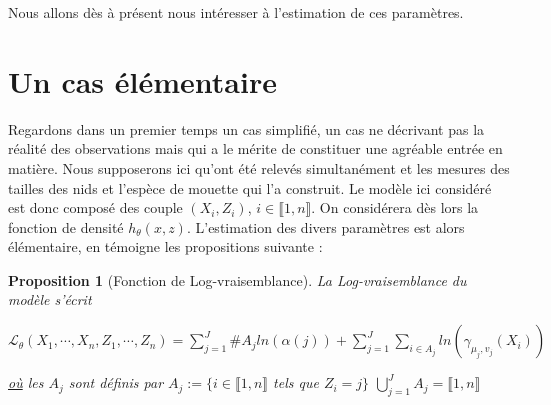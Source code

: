 \documentclass[frenchb]{report}
\newcommand{\1}{\mathbbm{1}}
\newtheorem{prop}{Proposition}
\theoremstyle{definition}\newtheorem{defn}{Définition}
\theoremstyle{definition}\newtheorem{exm}{Exemple}
\theoremstyle{definition}\newtheorem{nota}{Notation}
\theoremstyle{definition}\newtheorem{rem}{Remarque}
\begin{document}
Nous allons dès à présent nous intéresser à l'estimation de ces paramètres.

\section{Un cas élémentaire}

Regardons dans un premier temps un cas simplifié, un cas ne décrivant pas la réalité des observations mais qui a le mérite de constituer une agréable entrée en matière. \newline
Nous supposerons ici qu'ont été relevés simultanément et les mesures des tailles des nids et l'espèce de mouette qui l'a construit. Le modèle ici considéré est donc composé des couple $(X_i, Z_i)$, $i \in \llbracket1,n \rrbracket$. On considérera dès lors la fonction de densité $h_\theta(x,z)$.\newline
L'estimation des divers paramètres est alors élémentaire, en témoigne les propositions suivante :
\begin{prop}[Fonction de Log-vraisemblance]
La Log-vraisemblance du modèle s'écrit
\begin{center} $\mathcal{L}_\theta(X_1, \cdots, X_n, Z_1, \cdots, Z_n) = \displaystyle \sum_{j=1}^J \#A_j ln(\alpha(j)) + \sum_{j=1}^J\sum_{i\in A_j}ln(\gamma_{\mu_j, v_j}(X_i))$ \end{center}
\underline{où} les $A_j$ sont définis par $A_j := \{ i\in \llbracket1,n \rrbracket$ tels que $Z_i = j \}$  $\displaystyle\bigcup_{j=1}^J A_j = \llbracket1,n \rrbracket$
\end{prop}
\end{document}
